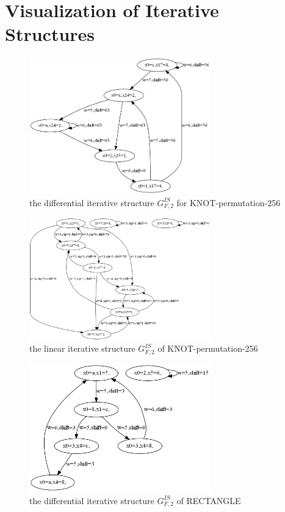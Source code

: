 \appendix

\section{Visualization of Iterative Structures\label{app:visualization}}

\begin{figure}
	\centering
	\includegraphics[width=0.7\textwidth]{fig/graph_knot256_ddt.PNG}
	\caption{the differential iterative structure $G^{IS}_{F,2}$ for KNOT-permutation-256} \label{fig:graph_knot256_ddt}
\end{figure}

\begin{figure}
	\centering
	\includegraphics[width=0.7\textwidth]{fig/graph_knot256_lat.PNG}
	\caption{the linear iterative structure $G^{IS}_{F,2}$ of KNOT-permutation-256} \label{fig:graph_knot256_lat}
\end{figure}
\begin{figure}
	\centering
	\includegraphics[width=0.7\textwidth]{fig/graph_rect_ddt.PNG}
	\caption{the differential iterative structure $G^{IS}_{F,2}$ of RECTANGLE} \label{fig:graph_rect_ddt}
\end{figure}

